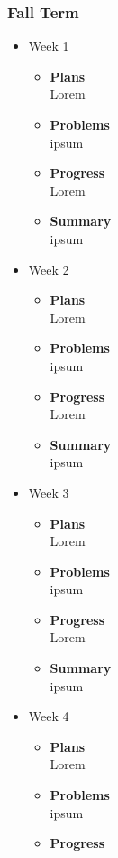 	\subsubsection{Fall Term}
	\begin{itemize}
		\item{Week 1}
			\begin{itemize}
				\item \textbf{Plans} \\
				Lorem
				\item \textbf{Problems} \\
				ipsum
				\item \textbf{Progress} \\
				Lorem
				\item \textbf{Summary} \\
				ipsum
			\end{itemize}
		\item{Week 2}
			\begin{itemize}
				\item \textbf{Plans} \\
				Lorem
				\item \textbf{Problems} \\
				ipsum
				\item \textbf{Progress} \\
				Lorem
				\item \textbf{Summary} \\
				ipsum
			\end{itemize}
		\item{Week 3}	
			\begin{itemize}
				\item \textbf{Plans} \\
				Lorem
				\item \textbf{Problems} \\
				ipsum
				\item \textbf{Progress} \\
				Lorem
				\item \textbf{Summary} \\
				ipsum
			\end{itemize}
		\item{Week 4}
			\begin{itemize}
				\item \textbf{Plans} \\
				Lorem
				\item \textbf{Problems} \\
				ipsum
				\item \textbf{Progress} \\

\end{itemize}
\end{itemize}
